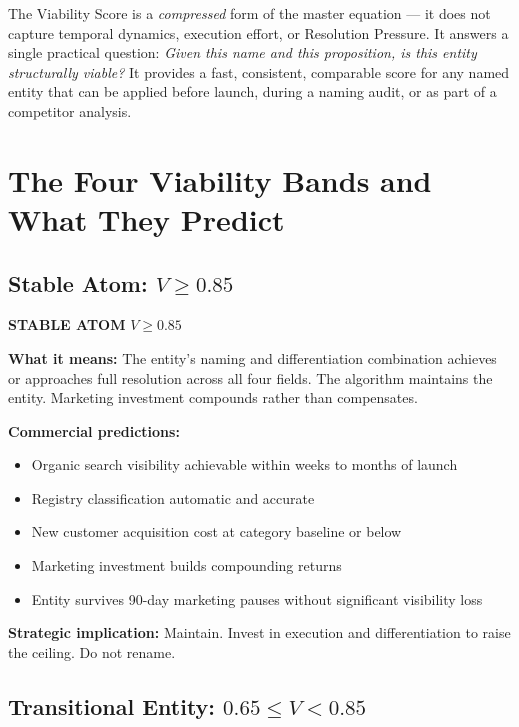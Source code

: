 \documentclass[12pt, openany]{book}
\theoremstyle{thmstyle}
\theoremstyle{defstyle}
\begin{document}
The Viability Score is a \textit{compressed} form of the master equation --- it does not capture temporal dynamics, execution effort, or Resolution Pressure. It answers a single practical question: \textit{Given this name and this proposition, is this entity structurally viable?} It provides a fast, consistent, comparable score for any named entity that can be applied before launch, during a naming audit, or as part of a competitor analysis.

\section{The Four Viability Bands and What They Predict}

\subsection{Stable Atom: $V \geq 0.85$}

\begin{stablebox}
\textbf{STABLE ATOM} \hfill $V \geq 0.85$

\vspace{4pt}
\textbf{What it means:} The entity's naming and differentiation combination achieves or approaches full resolution across all four fields. The algorithm maintains the entity. Marketing investment compounds rather than compensates.

\textbf{Commercial predictions:}
\begin{itemize}[leftmargin=1.5em, topsep=2pt]
  \item Organic search visibility achievable within weeks to months of launch
  \item Registry classification automatic and accurate
  \item New customer acquisition cost at category baseline or below
  \item Marketing investment builds compounding returns
  \item Entity survives 90-day marketing pauses without significant visibility loss
\end{itemize}

\textbf{Strategic implication:} Maintain. Invest in execution and differentiation to raise the ceiling. Do not rename.
\end{stablebox}

\subsection{Transitional Entity: $0.65 \leq V < 0.85$}
\end{document}

